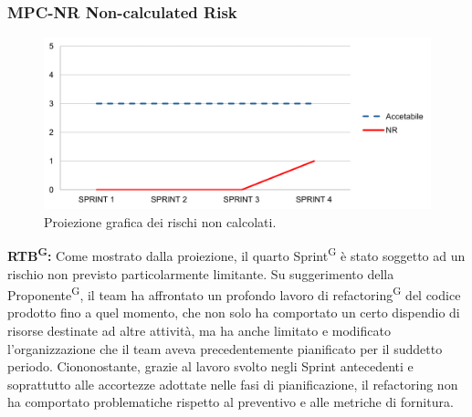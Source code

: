 \documentclass[8pt]{article}
\newcommand{\glossterm}[1]{#1\textsuperscript{G}} %
\begin{document}
\subsubsection{MPC-NR Non-calculated Risk}
\begin{figure}[h!]
    \centering
    \includegraphics[width=1\textwidth]{images_pdq/NR.png}
    \caption{Proiezione grafica dei rischi non calcolati.}
    \label{fig:Proiezione grafica dei rischi non calcolati}
\end{figure}
\textbf{\glossterm{RTB}:} Come mostrato dalla proiezione, il quarto \glossterm{Sprint} è stato soggetto ad un rischio non previsto particolarmente limitante. Su suggerimento della \glossterm{Proponente}, il team ha affrontato un profondo lavoro di \glossterm{refactoring} del codice prodotto fino a quel momento, che non solo ha comportato un certo dispendio di risorse destinate ad altre attività, ma ha anche limitato e modificato l'organizzazione che il team aveva precedentemente pianificato per il suddetto periodo. Ciononostante, grazie al lavoro svolto negli Sprint antecedenti e soprattutto alle accortezze adottate nelle fasi di pianificazione, il refactoring non ha comportato problematiche rispetto al preventivo e alle metriche di fornitura.
\end{document}
